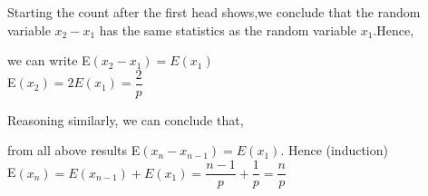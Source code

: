 \documentclass{beamer}
\begin{document}
\begin{frame}
Starting the count after the first head shows,we conclude that the random variable $x_2-x_1$ has the same statistics as the random variable $x_1$.Hence,
\begin{block}{we can write}
E$(x_2-x_1)=E(x_1)$\\\vspace{3mm}
E$(x_2)=2E(x_1)=\dfrac{2}{p}$
\end{block}
 Reasoning similarly, we can conclude that,
 \begin{block}{from all above results}
 E$(x_n-x_{n-1})=E(x_1)$. Hence (induction)\\\vspace{3mm}
 E$(x_n)=E(x_{n-1})+E(x_1)=\dfrac{n-1}{p}+\dfrac{1}{p}=\dfrac{n}{p}$
 \end{block}
\end{frame}
\end{document}
